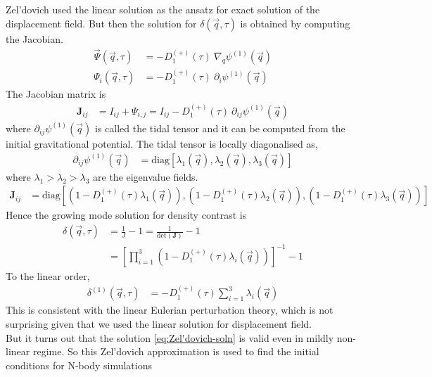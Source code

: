 \documentclass[12pt]{article}
\begin{document}
Zel'dovich used the linear solution as the ansatz for exact solution of the displacement field. But then the solution for $\delta (\vec{q},\tau)$ is obtained by computing the Jacobian.
\begin{align}
\vec{\Psi} (\vec{q}, \tau) &= - D_1^{(+)}(\tau) ~\nabla_{q} \psi^{(1)} (\vec{q})\\
\Psi_{i} (\vec{q}, \tau) &= - D_1^{(+)}(\tau) ~\partial_{i} \psi^{(1)} (\vec{q})
\end{align}
%
The Jacobian matrix is
\begin{align}
\bm{J}_{ij} &= I_{ij} + \Psi_{i,j} = I_{ij} - D_1^{(+)}(\tau) ~\partial_{ij} \psi^{(1)} (\vec{q})
\end{align}
where $\partial_{ij} \psi^{(1)} (\vec{q})$ is called the tidal tensor and it can be computed from the initial gravitational potential. The tidal tensor is locally diagonalised as,
\begin{align}
\partial_{ij} \psi^{(1)} (\vec{q}) &= \text{diag} \left[ \lambda_1 (\vec{q}), \lambda_2 (\vec{q}), \lambda_3 (\vec{q}) \right]
\end{align}
where $\lambda_1 > \lambda_2 >\lambda_3$ are the eigenvalue fields.\\
\begin{align}
\bm{J}_{ij} &= \text{diag} \left[ \left( 1 - D_1^{(+)}(\tau) \lambda_1 (\vec{q}) \right), \left( 1 - D_1^{(+)}(\tau) \lambda_2 (\vec{q}) \right), \left( 1 - D_1^{(+)}(\tau) \lambda_3 (\vec{q}) \right) \right]
\end{align}
Hence the growing mode solution for density contrast is
\begin{align}
\delta (\vec{q}, \tau) &= \frac{1}{J} - 1 = \frac{1}{\text{det}(\bm{J})} - 1\\
&= \left[ \prod_{i=1}^{3} \left( 1 - D_1^{(+)}(\tau) \lambda_i (\vec{q}) \right) \right]^{-1} - 1 \label{eq:Zel'dovich-soln}
\end{align}
To the linear order,
\begin{align}
\delta^{(1)} (\vec{q}, \tau)  &= - D_1^{(+)}(\tau) \sum_{i=1}^{3} \lambda_i (\vec{q})
\end{align}
This is consistent with the linear Eulerian perturbation theory, which is not surprising given that we used the linear solution for displacement field.\\
But it turns out that the solution \eqref{eq:Zel'dovich-soln} is valid even in mildly non-linear regime. So this Zel'dovich approximation is used to find the initial conditions for N-body simulations
\end{document}
